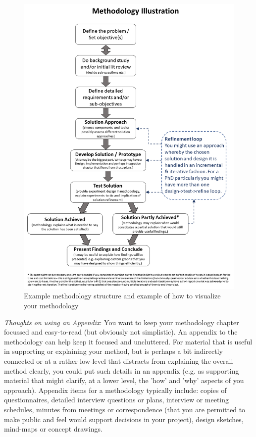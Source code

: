 \begin{figure}
	\centering
	\includegraphics[width=0.9\linewidth]{Chapters/Figures/methodology.png}
	\caption{Example methodology structure and example of how to visualize your methodology}
	\label{fig:methododviz}
\end{figure}

\emph{Thoughts on using an Appendix}: You want to keep your methodology chapter focussed and easy-to-read (but obviously not simplistic). An appendix to the methodology can help keep it focused and uncluttered. For material that is useful in supporting or explaining your method, but is perhaps a bit indirectly connected or at a rather low-level that distracts from explaining the overall method clearly, you could put such details in an appendix (e.g. as supporting material that might clarify, at a lower level, the 'how' and 'why' aspects of you approach). Appendix items for a methodology typically include: copies of questionnaires, detailed interview questions or plans, interview or meeting schedules, minutes from meetings or correspondence (that you are permitted to make public and feel would support decisions in your project), design sketches, mind-maps or concept drawings.
